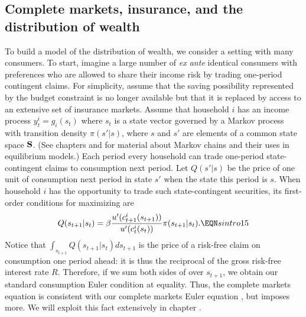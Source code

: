 \subsection{Complete markets, insurance, and the distribution of wealth}\label{sec:intro_complete}%
To build a model of the distribution of wealth, we consider a setting
with many consumers.
  To start, imagine a large number of {\it ex ante\/}
identical consumers with preferences  who are allowed
to share their income risk by trading one-period contingent
claims.  For simplicity, assume that the saving possibility
represented by the budget constraint  is no longer available but that it is replaced by access to an extensive set
of insurance markets. Assume that household $i$ has an income
process $y_t^i = g_i(s_t)$ where $s_t$ is a state vector governed
by a Markov process with transition density $\pi(s'|s)$, where $s$ and $s'$
are elements of a common state space ${\bf S}$.    (See
chapters  and  for  material about Markov
chains and their uses in equilibrium models.) Each period every household can trade
one-period state-contingent claims to consumption next period.
Let $Q(s'|s)$ be the price of one unit of consumption next period
in state $s'$ when the state this period is $s$. When household
$i$ has the opportunity to trade such state-contingent securities,
its first-order conditions for maximizing  are
$$ Q(s_{t+1}|s_t)  = \beta {u'(c^i_{t+1}(s_{t+1}))\over u'(c^i_t(s_t)) }
     \pi(s_{t+1}|s_t) .
  \EQN sintro15 $$
Notice that $\int_{s_{t+1}} Q(s_{t+1} | s_t) d s_{t+1}$
is the price of a risk-free claim on consumption one period ahead: it is
thus the reciprocal of the gross risk-free interest rate $R$. Therefore, if we sum
both sides of  over $s_{t+1}$, we obtain our standard
consumption Euler condition   at
equality. Thus, the complete markets equation  is
consistent with our complete markets Euler equation , but 
imposes more. We will exploit
this fact extensively in chapter .


